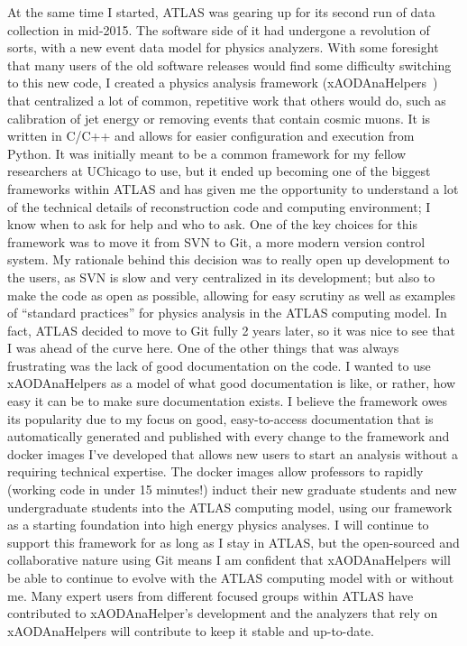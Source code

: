 \documentclass[letterpaper, 10pt]{article}
\begin{document}
At the same time I started, ATLAS was gearing up for its second run of data collection in mid-2015. The software side of it had undergone a revolution of sorts, with a new event data model for physics analyzers. With some foresight that many users of the old software releases would find some difficulty switching to this new code, I created a physics analysis framework (xAODAnaHelpers~) that centralized a lot of common, repetitive work that others would do, such as calibration of jet energy or removing events that contain cosmic muons. It is written in C/C++ and allows for easier configuration and execution from Python. It was initially meant to be a common framework for my fellow researchers at UChicago to use, but it ended up becoming one of the biggest frameworks within ATLAS and has given me the opportunity to understand a lot of the technical details of reconstruction code and computing environment; I know when to ask for help and who to ask. One of the key choices for this framework was to move it from SVN to Git, a more modern version control system. My rationale behind this decision was to really open up development to the users, as SVN is slow and very centralized in its development; but also to make the code as open as possible, allowing for easy scrutiny as well as examples of ``standard practices'' for physics analysis in the ATLAS computing model. In fact, ATLAS decided to move to Git fully 2 years later, so it was nice to see that I was ahead of the curve here. One of the other things that was always frustrating was the lack of good documentation on the code. I wanted to use xAODAnaHelpers as a model of what good documentation is like, or rather, how easy it can be to make sure documentation exists. I believe the framework owes its popularity due to my focus on good, easy-to-access documentation that is automatically generated and published with every change to the framework and docker images I've developed that allows new users to start an analysis without a requiring technical expertise. The docker images allow professors to rapidly (working code in under 15 minutes!) induct their new graduate students and new undergraduate students into the ATLAS computing model, using our framework as a starting foundation into high energy physics analyses. I will continue to support this framework for as long as I stay in ATLAS, but the open-sourced and collaborative nature using Git means I am confident that xAODAnaHelpers will be able to continue to evolve with the ATLAS computing model with or without me. Many expert users from different focused groups within ATLAS have contributed to xAODAnaHelper's development and the analyzers that rely on xAODAnaHelpers will contribute to keep it stable and up-to-date.
\end{document}
